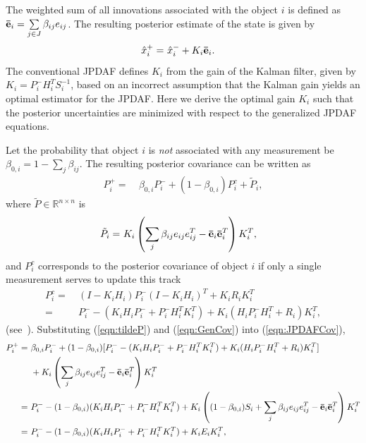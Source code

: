 \documentclass[letterpaper, paper,10pt]{AAS}		%
\newcommand{\parenth}[1]{\ensuremath{\left( #1 \right)}}
\newcommand{\refeqn}[1]{(\ref{eqn:#1})}
\renewcommand{\Re}{\ensuremath{\mathbb{R}}}
\begin{document}
The weighted sum of all innovations associated with the object $i$ is defined as ${\bf\bar{e}}_{i}={\sum\limits_{j\in J} \beta_{ij}e_{ij}}$.
The resulting posterior estimate of the state is given by
\begin{align}
\hat x^+_{i}=&\ \hat x^-_{i}+K_{i}{\bf\bar{e}}_{i}.\label{eqn:KalEst}
\end{align}
The conventional JPDAF defines $K_i$ from the gain of the Kalman filter, given by $K_i=P^-_iH_i^TS_i^{-1}$, based on an incorrect assumption that the Kalman gain yields an optimal estimator for the JPDAF.
Here we derive the optimal gain $K_i$ such that the posterior uncertainties are minimized with respect to the generalized JPDAF equations.

Let the probability that object $i$ is \emph{not} associated with any measurement be $\beta_{0,i}=1-{\sum\limits_{j} \beta_{ij}}$.
The resulting posterior covariance can be written as
\begin{align}
\label{eqn:JPDAFCov}
P^+_{i}=&\ \beta_{0,i}P^-_{i}+(1-\beta_{0,i})P_i^c+\tilde P_i,
\end{align}
where $\tilde P\in\Re^{n\times n}$ is
\begin{align}
\tilde P_i=&\ K_i\parenth{{\sum\limits_{j} \beta_{ij}e_{ij}e_{ij}^T-{\bf\bar{e}}_{i}}{\bf\bar{e}}_{i}^T}K_{i}^T,\label{eqn:tildeP}
\end{align}
and $P_i^c$ corresponds to the posterior covariance of object $i$ if only a single measurement serves to update this track~\cite{TrackDataAssoc}%
\begin{align}
P^c_i=&\ (I-K_iH_i)P^-_i(I-K_iH_i)^T+K_iR_iK_i^T\nonumber
\\
=&\ P^-_i-(K_iH_iP^-_i+P^-_iH_i^TK_i^T)+K_i(H_iP^-_iH_i^T+R_i)K_i^T,
\label{eqn:GenCov}
\end{align}
(see~\cite{OptEst1}).
Substituting \refeqn{tildeP} and \refeqn{GenCov} into \refeqn{JPDAFCov},%
\begin{align}
P^+_{i}=&\ \beta_{0,i}P^-_{i}+(1-\beta_{0,i})[P^-_i-(K_iH_iP^-_i+P^-_iH_i^TK_i^T)+K_i(H_iP^-_iH_i^T+R_i)K_i^T]\nonumber
\\
&\ +K_i\left({\sum\limits_{j} \beta_{ij}e_{ij}e_{ij}^T-{\bf\bar{e}}_{i}}{\bf\bar{e}}_{i}^T\right)K_{i}^T\nonumber
\\
=&\ P^-_{i}-(1-\beta_{0,i})(K_iH_iP^-_i+P^-_iH_i^TK_i^T)+K_i\left((1-\beta_{0,i})S_i+{\sum\limits_{j} \beta_{ij}e_{ij}e_{ij}^T-{\bf\bar{e}}_{i}}{\bf\bar{e}}_{i}^T\right)K_i^T\nonumber%
\\
=&\ P^-_{i}-(1-\beta_{0,i})(K_iH_iP^-_i+P^-_iH_i^TK_i^T)+K_iE_iK_i^T,\label{eqn:CovExpanded}
\end{align}
\end{document}
